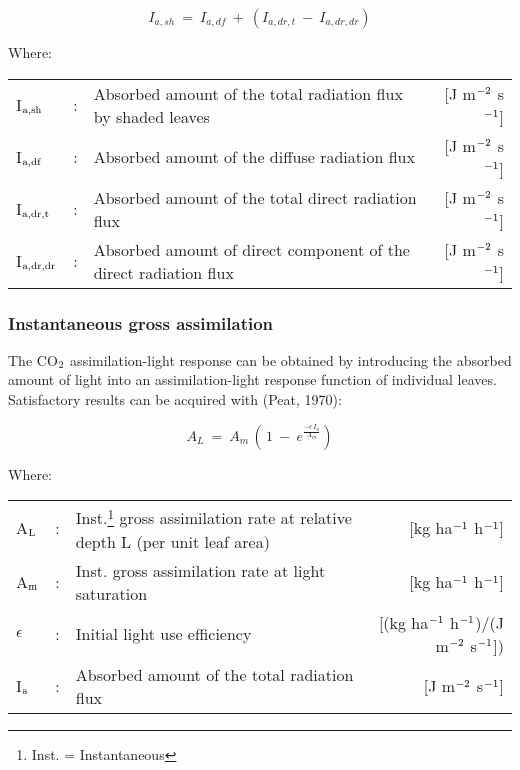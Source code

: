\begin{equation}
I _{a,sh} ~=~ I _{a,df} ~+~ (I _{a,dr,t} ~-~ I _{a,dr,dr} )
\end{equation}

Where:\\
\begin{tabularx}{\textwidth}{llXr}
I$_{{\rm a,sh}}$ &:& Absorbed amount of the total radiation flux by shaded leaves    &    [J m$^{{\rm -2}}$ s$^{{\rm -1}}$]\\
I$_{{\rm a,df}}$ &:& Absorbed amount of the diffuse radiation flux   &     [J m$^{{\rm -2}}$ s$^{{\rm -1}}$]\\
I$_{{\rm a,dr,t}}$ &:& Absorbed amount of the total direct radiation flux   &     [J m$^{{\rm -2}}$ s$^{{\rm -1}}$]\\
I$_{{\rm a,dr,dr}}$ &:& Absorbed amount of direct component of the  direct radiation flux & [J m$^{{\rm -2}}$ s$^{{\rm -1}}$]\\
\end{tabularx}


\subsubsection{Instantaneous gross assimilation}
The CO$_{{\rm 2}}$ assimilation-light response can be obtained by introducing the absorbed amount
of light into an assimilation-light response function of individual leaves. Satisfactory
results can be acquired with (Peat, 1970):

\begin{equation}
A _{L} ~=~ A _{m} \, (\, 1~-~ e ^{{\frac{ - \epsilon\, I _{a} }{ A _{m} }} } )
\end{equation}

Where:\\
\begin{tabularx}{\textwidth}{llXr}
A$_{{\rm L}}$ &:& Inst.\footnote{ Inst. = Instantaneous} gross assimilation rate at relative depth L (per unit leaf area)    &    [kg ha$^{{\rm -1}}$ h$^{{\rm -1}}$]\\
A$_{{\rm m}}$ &:& Inst. gross assimilation rate at light saturation    &    [kg ha$^{{\rm -1}}$ h$^{{\rm -1}}$]\\
$\epsilon$ &:& Initial light use efficiency   &   [(kg ha$^{{\rm -1}}$ h$^{{\rm -1}}$)/(J m$^{{\rm -2}}$ s$^{{\rm -1}}$])\\
I$_{{\rm a}}$ &:& Absorbed amount of the total radiation flux     &   [J m$^{{\rm -2}}$ s$^{{\rm -1}}$]\\
\end{tabularx}

